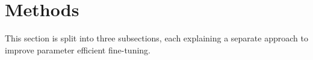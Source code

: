 \section{Methods}
This section is split into three subsections, each explaining a separate approach to improve parameter efficient fine-tuning.


